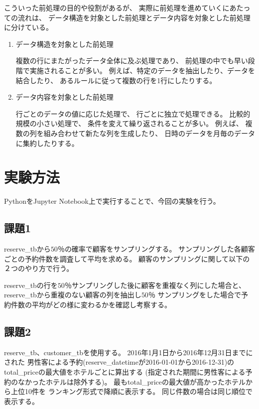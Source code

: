 \documentclass[12pt]{jarticle}
\begin{document}
こういった前処理の目的や役割があるが、
実際に前処理を進めていくにあたっての流れは、
データ構造を対象とした前処理とデータ内容を対象とした前処理に分けている。
\begin{enumerate}
    \item データ構造を対象とした前処理

          複数の行にまたがったデータ全体に及ぶ処理であり、
          前処理の中でも早い段階で実施されることが多い。
          例えば、特定のデータを抽出したり、データを結合したり、
          あるルールに従って複数の行を1行にしたりする。

    \item データ内容を対象とした前処理

          行ごとのデータの値に応じた処理で、
          行ごとに独立で処理できる。
          比較的規模の小さい処理で、
          条件を変えて繰り返されることが多い。
          例えば、
          複数の列を組み合わせて新たな列を生成したり、
          日時のデータを月毎のデータに集約したりする。
\end{enumerate}

\clearpage

\section{実験方法}
PythonをJupyter Notebook上で実行することで、今回の実験を行う。


\subsection{課題1}
reserve\_tbから$50％$の確率で顧客をサンプリングする。
サンプリングした各顧客ごとの予約件数を調査して平均を求める。
顧客のサンプリングに関して以下の２つのやり方で行う。

reserve\_tbの行を$50％$サンプリングした後に顧客を重複なく列にした場合と、
reserve\_tbから重複のない顧客の列を抽出し$50％$
サンプリングをした場合で予約件数の平均がどの様に変わるかを確認し考察する。

\subsection{課題2}
reserve\_tb、customer\_tbを使用する。
2016年1月1日から2016年12月31日までにされた
男性客による予約(reserve\_datetimeが2016-01-01から2016-12-31)の
total\_priceの最大値をホテルごとに算出する
(指定された期間に男性客による予約のなかったホテルは除外する)。
最もtotal\_priceの最大値が高かったホテルから上位10件を
ランキング形式で降順に表示する。
同じ件数の場合は同じ順位で表示する。
\end{document}
